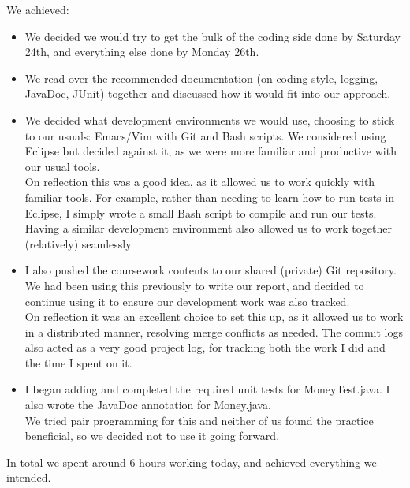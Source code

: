\documentclass[titlepage, 12pt]{extarticle}
\begin{document}
We achieved:
\begin{itemize}
\item  We decided we would try to get the bulk of the coding side done by Saturday 24th, and everything else done by Monday 26th.
\item We read over the recommended documentation (on coding style, logging, JavaDoc, JUnit) together and discussed how it would fit into our approach.
\item We decided what development environments we would use, choosing to stick to our usuals: Emacs/Vim with Git and Bash scripts. We considered using Eclipse but decided against it, as we were more familiar and productive with our usual tools. \\ On reflection this was a good idea, as it allowed us to work quickly with familiar tools. For example, rather than needing to learn how to run tests in Eclipse, I simply wrote a small Bash script to compile and run our tests. Having a similar development environment also allowed us to work together (relatively) seamlessly.
\item I also pushed the coursework contents to our shared (private) Git repository. We had been using this previously to write our report, and decided to continue using it to ensure our development work was also tracked. \\ On reflection it was an excellent choice to set this up, as it allowed us to work in a distributed manner, resolving merge conflicts as needed. The commit logs also acted as a very good project log, for tracking both the work I did and the time I spent on it.
\item I began adding and completed the required unit tests for MoneyTest.java. I also wrote the JavaDoc annotation for Money.java. \\ We tried pair programming for this and neither of us found the practice beneficial, so we decided not to use it going forward. 
\end{itemize}

In total we spent around 6 hours working today, and achieved everything we intended. 
\end{document}
